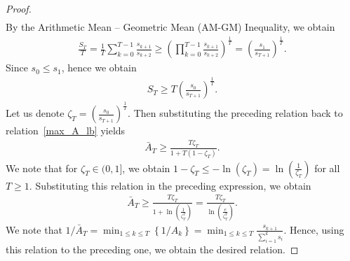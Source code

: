 \documentclass{article}
\theoremstyle{plain}
\theoremstyle{definition}
\theoremstyle{remark}
\begin{document}
\begin{proof}
\begin{align}
\end{align}
By the Arithmetic Mean -- Geometric Mean (AM-GM) Inequality, we obtain
\begin{align*}
    \frac{S_T}{T} = \frac{1}{T} \sum_{k=0}^{T-1} \frac{s_{k+1}}{s_{k+2}} \geq \left( \prod_{k=0}^{T-1} \frac{s_{k+1}}{s_{k+2}} \right)^{\frac{1}{T}} = \left(\frac{s_1}{s_{T+1}} \right)^{\frac{1}{T}} .
\end{align*}
Since $s_0 \leq s_1$, hence we obtain
\begin{align*}
    S_T \geq T \left(\frac{s_0}{s_{T+1}} \right)^{\frac{1}{T}} .
\end{align*}
Let us denote $\zeta_T = \left(\frac{s_0}{s_{T+1}} \right)^{\frac{1}{T}}$. Then substituting the preceding relation back to relation~\eqref{max_A_lb} yields
\begin{align*}
    \bar A_T \geq \frac{T \zeta_T}{1 + T ( 1 - \zeta_T)} .
\end{align*}
We note that for $\zeta_T \in (0,1]$, we obtain $1 - \zeta_T \leq - \ln(\zeta_T) = \ln \left( \frac{1}{\zeta_T} \right)$ for all $T \geq 1$. Substituting this relation in the preceding expression, we obtain
\begin{align*}
    \bar A_T \geq \frac{T \zeta_T}{1 + \ln \left( \frac{1}{\zeta_T^T} \right)} = \frac{T \zeta_T}{\ln \left( \frac{e}{\zeta_T^T} \right)} .
\end{align*}
We note that $1/{\bar A_T} = \min_{1 \leq k \leq T} \left\{1/{A_k} \right\} = \min_{1 \leq k \leq T} \frac{s_{k+1}}{\sum_{i=1}^k s_i}$. Hence, using this relation to the preceding one, we obtain the desired relation.
\end{proof}

\end{document}
